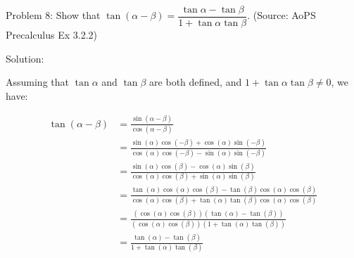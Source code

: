 Problem 8: Show that $\tan(\alpha - \beta) = \dfrac{\tan\alpha - \tan\beta}{1+\tan\alpha\tan \beta}$. (Source: AoPS Precalculus Ex 3.2.2)

Solution:

Assuming that $\tan \alpha$ and $\tan \beta$ are both defined, and $1 + \tan \alpha \tan \beta \neq 0$, we have:

\begin{align*}
\tan(\alpha - \beta) &= \frac{\sin(\alpha - \beta)}{\cos(\alpha - \beta)} \\
&=\frac{\sin(\alpha) \cos(-\beta) + \cos(\alpha) \sin(-\beta)}{\cos(\alpha)\cos(-\beta) - \sin(\alpha)\sin(-\beta)} \\
&= \frac{\sin(\alpha)\cos(\beta) - \cos(\alpha)\sin(\beta)}{\cos(\alpha)\cos(\beta) + \sin(\alpha)\sin(\beta)} \\
&= \frac{\tan(\alpha)\cos(\alpha)\cos(\beta) - \tan(\beta)\cos(\alpha)\cos(\beta)}{\cos(\alpha)\cos(\beta) + \tan(\alpha)\tan(\beta)\cos(\alpha)\cos(\beta)} \\
&= \frac{(\cos(\alpha)\cos(\beta))(\tan(\alpha) - \tan(\beta))}{(\cos(\alpha)\cos(\beta))(1 + \tan(\alpha)\tan(\beta))} \\
&= \frac{\tan(\alpha) - \tan(\beta)}{1 + \tan(\alpha)\tan(\beta)}
\end{align*}
